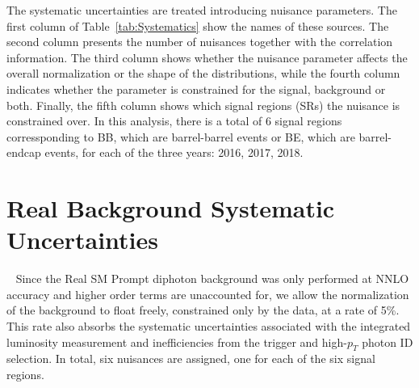 The systematic uncertainties are treated introducing nuisance parameters. The first column of Table~\ref{tab:Systematics} show the names of these sources. The second column presents the number of nuisances together with the correlation information. The third column shows whether the nuisance parameter affects the overall normalization or the shape of the distributions, while the fourth column indicates whether the parameter is constrained for the signal, background or both. Finally, the fifth column shows which signal regions (SRs) the nuisance is constrained over. In this analysis, there is a total of 6 signal regions corressponding to BB, which are barrel-barrel events or BE, which are barrel-endcap events, for each of the three years: 2016, 2017, 2018.







\section{Real Background Systematic Uncertainties}~\label{sec:realBKGSYS}
Since the Real SM Prompt diphoton background was only performed at NNLO accuracy and higher order terms are unaccounted for, we allow the normalization of the background to float freely, constrained only by the data, at a rate of 5\%. This rate also absorbs the systematic uncertainties associated with the integrated luminosity measurement and inefficiencies from the trigger and high-$p_T$ photon ID selection. In total, six nuisances are assigned, one for each of the six signal regions. 

